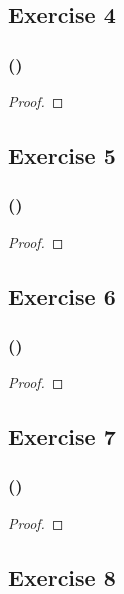 \documentclass[14pt]{extarticle}
\begin{document}
\subsection{Exercise 4}

\subsubsection{()}

\begin{proof}

\end{proof}

\subsection{Exercise 5}

\subsubsection{()}

\begin{proof}

\end{proof}

\subsection{Exercise 6}

\subsubsection{()}

\begin{proof}

\end{proof}

\subsection{Exercise 7}

\subsubsection{()}

\begin{proof}

\end{proof}

\subsection{Exercise 8}
\end{document}

